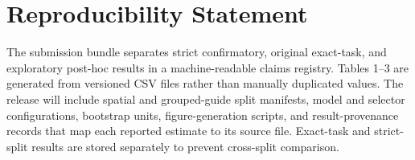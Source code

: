 \section{Reproducibility Statement}
The submission bundle separates strict confirmatory, original exact-task, and
exploratory post-hoc results in a machine-readable claims registry. Tables
1--3 are generated from versioned CSV files rather than manually duplicated
values. The release will include spatial and grouped-guide split manifests,
model and selector configurations, bootstrap units, figure-generation scripts,
and result-provenance records that map each reported estimate to its source
file. Exact-task and strict-split results are stored separately to prevent
cross-split comparison.

\clearpage



